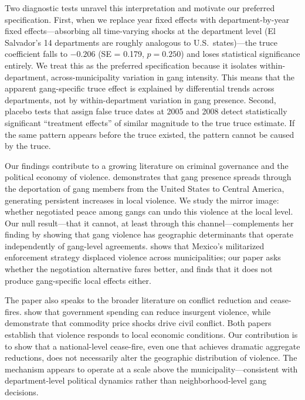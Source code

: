 \documentclass[12pt]{article}
\begin{document}
Two diagnostic tests unravel this interpretation and motivate our preferred specification. First, when we replace year fixed effects with department-by-year fixed effects---absorbing all time-varying shocks at the department level (El Salvador's 14 departments are roughly analogous to U.S.\ states)---the truce coefficient falls to $-0.206$ (SE = 0.179, $p = 0.250$) and loses statistical significance entirely. We treat this as the preferred specification because it isolates within-department, across-municipality variation in gang intensity. This means that the apparent gang-specific truce effect is explained by differential trends across departments, not by within-department variation in gang presence. Second, placebo tests that assign false truce dates at 2005 and 2008 detect statistically significant ``treatment effects'' of similar magnitude to the true truce estimate. If the same pattern appears before the truce existed, the pattern cannot be caused by the truce.

Our findings contribute to a growing literature on criminal governance and the political economy of violence. \citet{sviatschi2022} demonstrates that gang presence spreads through the deportation of gang members from the United States to Central America, generating persistent increases in local violence. We study the mirror image: whether negotiated peace among gangs can undo this violence at the local level. Our null result---that it cannot, at least through this channel---complements her finding by showing that gang violence has geographic determinants that operate independently of gang-level agreements. \citet{dell2015} shows that Mexico's militarized enforcement strategy displaced violence across municipalities; our paper asks whether the negotiation alternative fares better, and finds that it does not produce gang-specific local effects either.

The paper also speaks to the broader literature on conflict reduction and cease-fires. \citet{berman_etal2011} show that government spending can reduce insurgent violence, while \citet{dube_vargas2013} demonstrate that commodity price shocks drive civil conflict. Both papers establish that violence responds to local economic conditions. Our contribution is to show that a national-level cease-fire, even one that achieves dramatic aggregate reductions, does not necessarily alter the geographic distribution of violence. The mechanism appears to operate at a scale above the municipality---consistent with department-level political dynamics rather than neighborhood-level gang decisions.
\end{document}
